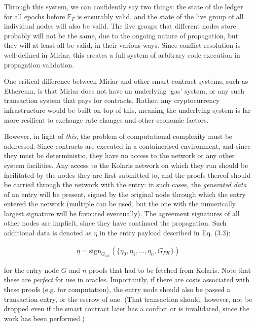 \documentclass{extreport}
\begin{document}
Through this system, we can confidently say two things: the state of the ledger for all epochs before \(\mathbb{E}_\Gamma\) is ensurably valid, and the state of the live group of all individual nodes will also be valid. The live groups that different nodes store probably will not be the same, due to the ongoing nature of propagation, but they will at least all be valid, in their various ways. Since conflict resolution is well-defined in Miriar, this creates a full system of arbitrary code execution in propagation validation.

One critical difference between Miriar and other smart contract systems, such as Ethereum, is that Miriar does not have an underlying 'gas' system, or any such transaction system that pays for contracts. Rather, any cryptocurrency infrastructure would be built on top of this, meaning the underlying system is far more resilient to exchange rate changes and other economic factors.

However, in light of \emph{this}, the problem of computational complexity must be addressed. Since contracts are executed in a containerised environment, and since they must be deterministic, they have no access to the network or any other system facilities. Any access to the Kolaris network on which they run should be facilitated by the nodes they are first submitted to, and the proofs thereof should be carried through the network with the entry: in such cases, the \emph{generated data} of an entry will be present, signed by the original node through which the entry entered the network (multiple can be used, but the one with the numerically largest signature will be favoured eventually). The agreement signatures of all other nodes are implicit, since they have continued the propagation. Such additional data is denoted as \(\eta\) in the entry payload described in Eq. (3.3):

\begin{align*}
\eta = \mathrm{sign}_{G_{SK}}(\{ \eta_0, \eta_1, ..., \eta_n, G_{PK} \}) \tag{8.1}
\end{align*}

for the entry node \(G\) and \(n\) proofs that had to be fetched from Kolaris. Note that these are \emph{perfect} for use in oracles. Importantly, if there are costs associated with these proofs (e.g. for computation), the entry node should also be passed a transaction entry, or the escrow of one. (That transaction should, however, not be dropped even if the smart contract later has a conflict or is invalidated, since the work has been performed.)
\end{document}
